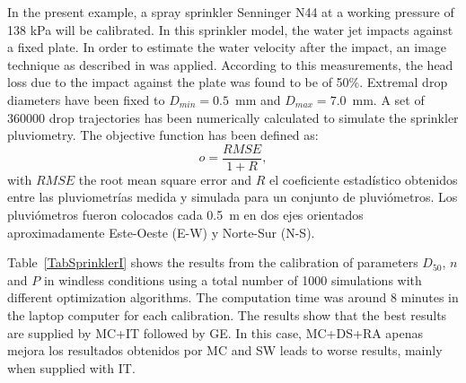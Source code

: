 \documentclass[review,authoryear]{elsarticle}
\newcommand{\EQ}[2]
{\begin{equation}#1\label{#2}\end{equation}}
\begin{document}
In the present example, a spray sprinkler Senninger N44 at a working pressure of 138 kPa will be calibrated. In this sprinkler model, the water jet impacts against a fixed plate. In order to estimate the water velocity after the impact, an image technique as described in \citet{Salvador09} was applied. According to this measurements, the head loss due to the impact against the plate was found to be of 50\%. Extremal drop diameters have been fixed to $D_{min}=0.5$~mm and
$D_{max}=7.0$~mm. A set of 360000 drop trajectories has been numerically calculated to simulate the sprinkler pluviometry. The objective function has been defined as:
\EQ{o=\frac{RMSE}{1+R},}{EqSprinklerObjective}
with $RMSE$ the root mean square error and $R$ el coeficiente estadístico obtenidos entre las pluviometrías medida y simulada para un conjunto de pluviómetros. Los pluviómetros fueron colocados cada 0.5~m en dos ejes orientados aproximadamente Este-Oeste (E-W) y Norte-Sur (N-S).

Table~\ref{TabSprinklerI} shows the results from the calibration of parameters $D_{50}$, $n$ and $P$ in windless conditions using a total number of 1000 simulations with different optimization algorithms. The computation time was around 8 minutes in the laptop computer for each calibration. The results show that the best results are supplied by MC+IT followed by GE. In this case,
MC+DS+RA apenas mejora los resultados obtenidos por MC
and SW leads to worse results, mainly when supplied with IT. 
\end{document}
